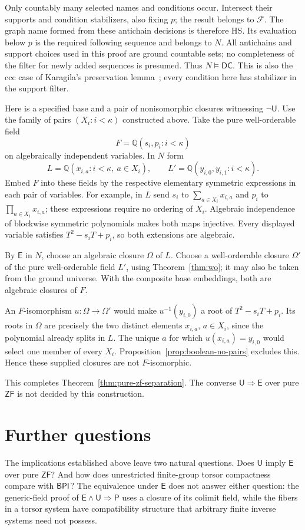 \documentclass[11pt,a4paper]{article}
\theoremstyle{definition}\newtheorem{definition}[theorem]{Definition}
\theoremstyle{remark}\newtheorem{remark}[theorem]{Remark}
\newcommand{\ZF}{\mathsf{ZF}}\newcommand{\ZFA}{\mathsf{ZFA}}
\newcommand{\E}{\mathsf E}\newcommand{\U}{\mathsf U}
\newcommand{\Q}{\mathbb Q}\newcommand{\F}{\mathbb F}
\begin{document}
Only countably many selected names and conditions occur. Intersect their supports and condition stabilizers, also fixing $p$; the result belongs to $\mathcal F$. The graph name formed from these antichain decisions is therefore HS. Its evaluation below $p$ is the required following sequence and belongs to $N$. All antichains and support choices used in this proof are ground countable sets; no completeness of the filter for newly added sequences is presumed. Thus $N\models\mathsf{DC}$. This is also the ccc case of Karagila's preservation lemma~\cite[Lemma~3.3]{KaragilaDC}; every condition here has stabilizer in the support filter.

Here is a specified base and a pair of nonisomorphic closures witnessing $\neg\U$. Use the family of pairs $(X_i:i<\kappa)$ constructed above. Take the pure well-orderable field
\[
F=\Q(s_i,p_i:i<\kappa)
\]
on algebraically independent variables. In $N$ form
\[
L=\Q(x_{i,a}:i<\kappa,\ a\in X_i),\qquad
L'=\Q(y_{i,0},y_{i,1}:i<\kappa).
\]
Embed $F$ into these fields by the respective elementary symmetric expressions in each pair of variables. For example, in $L$ send $s_i$ to $\sum_{a\in X_i}x_{i,a}$ and $p_i$ to $\prod_{a\in X_i}x_{i,a}$; these expressions require no ordering of $X_i$. Algebraic independence of blockwise symmetric polynomials makes both maps injective. Every displayed variable satisfies $T^2-s_iT+p_i$, so both extensions are algebraic.

By $\E$ in $N$, choose an algebraic closure $\Omega$ of $L$. Choose a well-orderable closure $\Omega'$ of the pure well-orderable field $L'$, using Theorem~\ref{thm:wo}; it may also be taken from the ground universe. With the composite base embeddings, both are algebraic closures of $F$.

An $F$-isomorphism $u:\Omega\to\Omega'$ would make $u^{-1}(y_{i,0})$ a root of $T^2-s_iT+p_i$. Its roots in $\Omega$ are precisely the two distinct elements $x_{i,a}$, $a\in X_i$, since the polynomial already splits in $L$. The unique $a$ for which $u(x_{i,a})=y_{i,0}$ would select one member of every $X_i$. Proposition~\ref{prop:boolean-no-pairs} excludes this. Hence these supplied closures are not $F$-isomorphic.

This completes Theorem~\ref{thm:pure-zf-separation}. The converse $\U\Rightarrow\E$ over pure $\ZF$ is not decided by this construction.

\section{Further questions}
The implications established above leave two natural questions. Does $\U$ imply $\E$ over pure $\ZF$? And how does unrestricted finite-group torsor compactness compare with $\mathsf{BPI}$? The equivalence under $\E$ does not answer either question: the generic-field proof of $\E\wedge\U\Rightarrow\mathsf P$ uses a closure of its colimit field, while the fibers in a torsor system have compatibility structure that arbitrary finite inverse systems need not possess.
\end{document}
